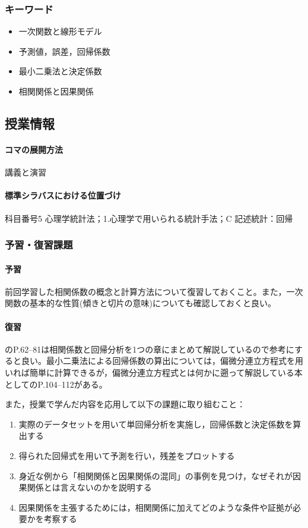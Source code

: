 \subsubsection{キーワード}
\begin{itemize}
	\item 一次関数と線形モデル
	\item 予測値，誤差，回帰係数
	\item 最小二乗法と決定係数
	\item 相関関係と因果関係
\end{itemize}
\subsection{授業情報}
\paragraph{コマの展開方法}
講義と演習
\paragraph{標準シラバスにおける位置づけ}
科目番号5 心理学統計法；1.心理学で用いられる統計手法；C 記述統計：回帰
\subsubsection{予習・復習課題}
\paragraph{予習}
前回学習した相関係数の概念と計算方法について復習しておくこと。また，一次関数の基本的な性質(傾きと切片の意味)についても確認しておくと良い。
\paragraph{復習}
\textcite{Yamauchi201001}のP.62--81は相関係数と回帰分析を1つの章にまとめて解説しているので参考にすると良い。最小二乗法による回帰係数の算出については，偏微分連立方程式を用いれば簡単に計算できるが，偏微分連立方程式とは何かに遡って解説している本として\textcite{kosugi2018}のP.104--112がある。

また，授業で学んだ内容を応用して以下の課題に取り組むこと：
\begin{enumerate}
	\item 実際のデータセットを用いて単回帰分析を実施し，回帰係数と決定係数を算出する
	\item 得られた回帰式を用いて予測を行い，残差をプロットする
	\item 身近な例から「相関関係と因果関係の混同」の事例を見つけ，なぜそれが因果関係とは言えないのかを説明する
	\item 因果関係を主張するためには，相関関係に加えてどのような条件や証拠が必要かを考察する
\end{enumerate}
